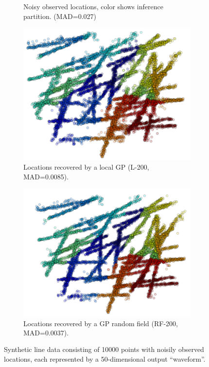 \documentclass{article}
\begin{document}
\begin{figure}
\begin{subfigure}[t]{.22\textwidth}
                \caption{Noisy observed locations, color shows
                  inference partition. (MAD=0.027)}
                \label{fig:linesinit}
        \end{subfigure}\hspace{0.5em}
\begin{subfigure}[t]{.22\textwidth}
                \includegraphics[width=\textwidth]{lines_local}
                \caption{Locations recovered by a local GP (L-200, MAD=0.0085). }
                \label{fig:lineslocal}
        \end{subfigure}\hspace{0.5em}
\begin{subfigure}[t]{.22\textwidth}
                \includegraphics[width=\textwidth]{lines_gprf}
                \caption{ Locations recovered by a GP random field
                  (RF-200, MAD=0.0037).}
                \label{fig:linesgprf}
        \end{subfigure}
\caption{Synthetic line data consisting of 10000 points with noisily
  observed locations, each represented by a
  50-dimensional output ``waveform''. }
\label{fig:lines}
\end{figure}
\end{document}
